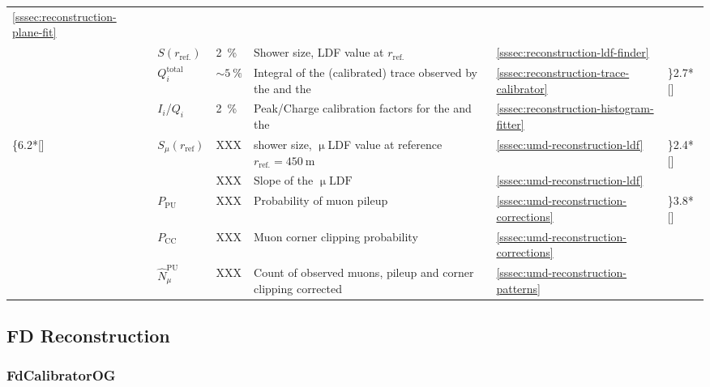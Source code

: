 \begin{table}
\begin{center}
\begin{tabular*}{1.0\textwidth}{M{0.6cm}M{1.7cm}M{1.1cm}|M{6.65cm}|M{2.6cm}M{0.6cm}}
	 \cref{sssec:reconstruction-plane-fit} \\ 
	 & $S(r_\mathrm{ref.})$ & \SI{2}{\percent} & Shower size, \acs{LDF} 
	 value at $r_\mathrm{ref.}$ & \cref{sssec:reconstruction-ldf-finder} \\
	 & $Q^\mathrm{total}_i$ & $\sim\SI{5}{\percent}$ & Integral of the 
	 (calibrated) trace observed by the \WCD and the \SSD & 
	 \cref{sssec:reconstruction-trace-calibrator} & 
 	 \rdelim\}{2.7}{*}[\parbox{4mm}{}] \\
	 & $I_i$/$Q_i$ & \SI{2}{\percent} & Peak/Charge calibration factors for
	 the \WCD \LPMTs and the \SSD \PMT & 
	 \cref{sssec:reconstruction-histogram-fitter} \\
	 \ldelim\{{6.2}{*}[\parbox{4mm}{}]
	 & $S_\mu(r_\mathrm{ref})$ & XXX & \UMD shower size, $\upmu$LDF value
	 at  reference $r_\mathrm{ref.} = \SI{450}{\meter}$ & 
	 \cref{sssec:umd-reconstruction-ldf} &
 	 \rdelim\}{2.4}{*}[\parbox{4mm}{}] 
	 \\
	 & \beta & XXX & Slope of the $\upmu\mathrm{LDF}$ & 
	 \cref{sssec:umd-reconstruction-ldf} \\
	 & $P_\mathrm{PU}$ & XXX & Probability of muon pileup & 
	 \cref{sssec:umd-reconstruction-corrections} & 
	\rdelim\}{3.8}{*}[\parbox{4mm}{}]
	\\
	& $P_\mathrm{CC}$ & XXX & Muon corner clipping probability & 
	\cref{sssec:umd-reconstruction-corrections} \\
	& $\hat{N}^\mathrm{PU}_\mu$ & XXX & Count of observed muons, pileup and
	corner clipping corrected & \cref{sssec:umd-reconstruction-patterns} \\
	\bottomrule
	\end{tabular*}
	\label{tab:rec-quantities}
	\end{center}
\end{table}
\endgroup

\subsection{FD Reconstruction}
\label{ssec:fd-reconstruction}

\halflift

\subsubsection{FdCalibratorOG}
\label{sssec:reconstruction-pixel-calibrator}

